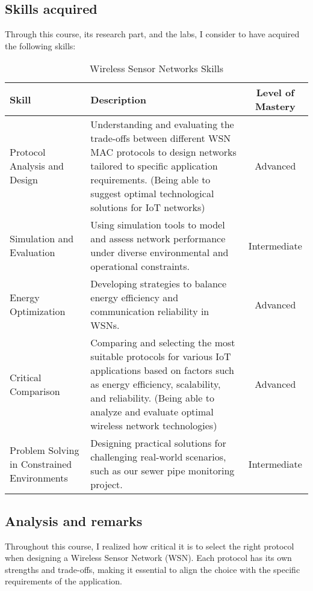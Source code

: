 \subsection{Skills acquired}
Through this course, its research part, and the labs, I consider to have acquired the following skills:

\begin{table}[H]
    \centering
    \renewcommand{\arraystretch}{1.5} %
    \begin{tabular}{|p{3.5cm}|p{8.5cm}|c|}
    \hline
    \rowcolor[gray]{0.8}
    \textbf{Skill} & \textbf{Description} & \textbf{Level of Mastery} \\
    \hline
    Protocol Analysis and Design & Understanding and evaluating the trade-offs between different WSN MAC protocols to design networks tailored to specific application requirements. (Being able to suggest optimal technological solutions for IoT networks) & Advanced \\
    \hline
    Simulation and Evaluation & Using simulation tools to model and assess network performance under diverse environmental and operational constraints. & Intermediate \\
    \hline
    Energy Optimization & Developing strategies to balance energy efficiency and communication reliability in WSNs. & Advanced \\
    \hline
    Critical Comparison & Comparing and selecting the most suitable protocols for various IoT applications based on factors such as energy efficiency, scalability, and reliability. (Being able to analyze and evaluate optimal wireless network technologies) & Advanced \\
    \hline
    Problem Solving in Constrained Environments & Designing practical solutions for challenging real-world scenarios, such as our sewer pipe monitoring project. & Intermediate \\
    \hline
    \end{tabular}
    \caption{Wireless Sensor Networks Skills}
    \label{tab:wsn_skills}
\end{table}

\subsection{Analysis and remarks}

\indent \indent Throughout this course, I realized how critical it is to select the right protocol when designing a Wireless Sensor Network (WSN). Each protocol has its own strengths and trade-offs, making it essential to align the choice with the specific requirements of the application.

